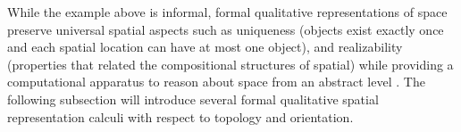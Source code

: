 \documentclass[12pt]{ucthesis}
\begin{document}
While the example above is informal, formal qualitative representations of space preserve universal spatial aspects such as uniqueness (objects exist exactly once and each spatial location can have at most one object), and realizability (properties that related the compositional structures of spatial) while providing a computational apparatus to reason about space from an abstract level \cite{freksa1991qsr}. The following subsection will introduce several formal qualitative spatial representation calculi with respect to topology and orientation. 



\end{document}
